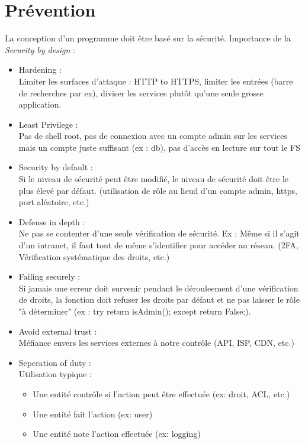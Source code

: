 \documentclass[a4paper]{article}
\begin{document}
\section{Prévention}
La conception d'un programme doit être basé sur la sécurité.
Importance de la \emph{Security by design} :
\begin{itemize}[label = \textbullet, font = \Large]
    \item Hardening : \\
    Limiter les surfaces d'attaque : HTTP to HTTPS, limiter les entrées (barre de recherches par ex), diviser les services plutôt qu'une seule grosse application.
    \item Least Privilege : \\
    Pas de shell root, pas de connexion avec un compte admin sur les services mais un compte juste suffisant (ex : db), pas d'accès en lecture sur tout le FS
    \item Security by default :\\
    Si le niveau de sécurité peut être modifié, le niveau de sécurité doit être le plus élevé par défaut. (utilisation de rôle au lieud d'un compte admin, https, port aléatoire, etc.)
    \item Defense in depth :\\
    Ne pas se contenter d'une seule vérification de sécurité. Ex : Même si il s'agit d'un intranet, il faut tout de même s'identifier pour accéder au réseau. (2FA, Vérification systématique des droits, etc.)
    \item Failing securely :\\
    Si jamais une erreur doit survenir pendant le dérouleement d'une vérification de droits, la fonction doit refuser les droits par défaut et ne pas laisser le rôle "à déterminer" (ex : try return isAdmin(); except return False;).
    \item Avoid external trust :\\
    Méfiance envers les services externes à notre contrôle (API, ISP, CDN, etc.)
    \item Seperation of duty : \\
    Utilisation typique : 
        \begin{itemize}[label = $\hookrightarrow$, font = \Large]
            \item Une entité contrôle si l'action peut être effectuée (ex: droit, ACL, etc.)
            \item Une entité fait l'action (ex: user)
            \item Une entité note l'action effectuée (ex: logging)

\end{itemize}
\end{itemize}
\end{document}
